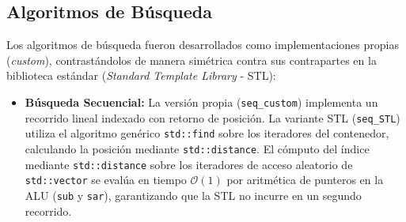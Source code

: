 \documentclass[11pt,letterpaper]{article}
\begin{document}
\subsection{Algoritmos de Búsqueda}
Los algoritmos de búsqueda fueron desarrollados como implementaciones propias (\textit{custom}), contrastándolos de manera simétrica contra sus contrapartes en la biblioteca estándar (\textit{Standard Template Library} - STL):
\begin{itemize}
    \item \textbf{Búsqueda Secuencial:} La versión propia (\texttt{seq\_custom}) implementa un recorrido lineal indexado con retorno de posición. La variante STL (\texttt{seq\_STL}) utiliza el algoritmo genérico \texttt{std::find} sobre los iteradores del contenedor, calculando la posición mediante \texttt{std::distance}. El cómputo del índice mediante \texttt{std::distance} sobre los iteradores de acceso aleatorio de \texttt{std::vector} se evalúa en tiempo $\mathcal{O}(1)$ por aritmética de punteros en la ALU (\texttt{sub} y \texttt{sar}), garantizando que la STL no incurre en un segundo recorrido.
    

\end{itemize}
\end{document}
